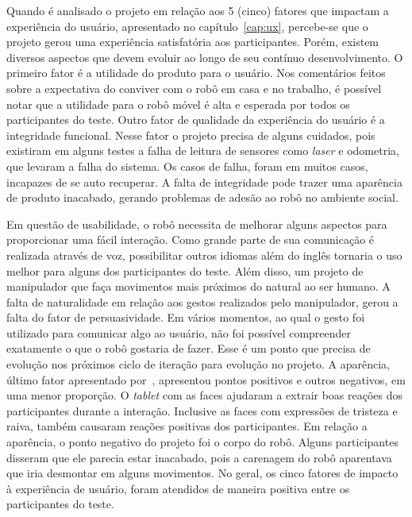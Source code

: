 Quando é analisado o projeto em relação aos 5 (cinco) fatores que impactam a experiência do usuário, apresentado no capítulo~\ref{cap:ux}, percebe-se que o projeto gerou uma experiência satisfatória aos participantes. Porém, existem diversos aspectos que devem evoluir ao longo de seu contínuo desenvolvimento. O primeiro fator é a utilidade do produto para o usuário. Nos comentários feitos sobre a expectativa do conviver com o robô em casa e no trabalho, é possível notar que a utilidade para o robô móvel é alta e esperada por todos os participantes do teste. Outro fator de qualidade da experiência do usuário é a integridade funcional. Nesse fator o projeto precisa de alguns cuidados, pois existiram em alguns testes a falha de leitura de sensores como \emph{laser} e odometria, que levaram a falha do sistema. Os casos de falha, foram em muitos casos, incapazes de se auto recuperar. A falta de integridade pode trazer uma aparência de produto inacabado, gerando problemas de adesão ao robô no ambiente social.

Em questão de usabilidade, o robô necessita de melhorar alguns aspectos para proporcionar uma fácil interação. Como grande parte de sua comunicação é realizada através de voz, possibilitar outros idiomas além do inglês tornaria o uso melhor para alguns dos participantes do teste. Além disso, um projeto de manipulador que faça movimentos mais próximos do natural ao ser humano. A falta de naturalidade em relação aos gestos realizados pelo manipulador, gerou a falta do fator de persuasividade. Em vários momentos, ao qual o gesto foi utilizado para comunicar algo ao usuário, não foi possível compreender exatamente o que o robô gostaria de fazer. Esse é um ponto que precisa de evolução nos próximos ciclo de iteração para evolução no projeto. A aparência, último fator apresentado por~\textcite{hartson:2012}, apresentou pontos positivos e outros negativos, em uma menor proporção. O \emph{tablet} com as faces ajudaram a extrair boas reações dos participantes durante a interação. Inclusive as faces com expressões de tristeza e raiva, também causaram reações positivas dos participantes. Em relação a aparência, o ponto negativo do projeto foi o corpo do robô. Alguns participantes disseram que ele parecia estar inacabado, pois a carenagem do robô aparentava que iria desmontar em alguns movimentos. No geral, os cinco fatores de impacto à experiência de usuário, foram atendidos de maneira positiva entre os participantes do teste.


